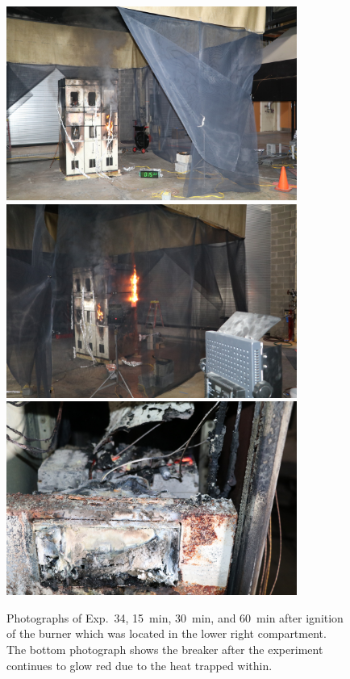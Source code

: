 \begin{figure}[p]
\centering
\includegraphics[height=2.50in]{../FIGURES/Test_34_15_min} \\
\includegraphics[height=2.50in]{../FIGURES/Test_34_30_min} \\
\includegraphics[height=2.50in]{../FIGURES/Test_34_60_min}
\caption[Photographs of Exp.~34]{Photographs of Exp.~34, 15~min, 30~min, and 60~min after ignition of the burner which was located in the lower right compartment. The bottom photograph shows the breaker after the experiment continues to glow red due to the heat trapped within.}
\label{fig:Test_34_photos}
\end{figure}


\clearpage

